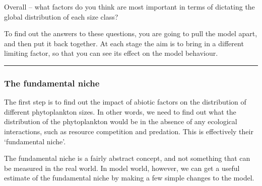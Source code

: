 \vspace{1mm}

Overall -- what factors do you think are most important in terms of dictating the global distribution of each size class?

To find out the answers to these questions, you are going to pull the model apart, and then put it back together. At each stage the aim is to bring in a different limiting factor, so that you can see its effect on the model behaviour.

\vspace{1mm}
\noindent\rule{4cm}{0.1mm}

\subsubsection*{The fundamental niche}
\vspace{1mm}

The first step is to find out the impact of abiotic factors on the distribution of different phytoplankton sizes. In other words, we need to find out what the distribution of the phytoplankton would be in the absence of any ecological interactions, such as resource competition and predation. This is effectively their `fundamental niche'.

\vspace{1mm}
The fundamental niche is a fairly abstract concept, and not something that can be measured in the real world. In model world, however, we can get a useful estimate of the fundamental niche by making a few simple changes to the model.

